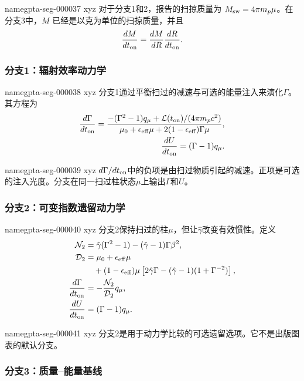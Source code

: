 \documentclass[twocolumn]{aastex702}
\makeatletter
\providecommand{\gptareaderanchor}[1]{\pdfdest name{#1} xyz}%
\providecommand{\gptareaderanchor}[1]{\special{pdf:dest (#1) [ @thispage /XYZ @xpos @ypos null ]}}%
\makeatother
\begin{document}
\gptareaderanchor{gpta-seg-000037}%
对于分支1和2，报告的扫掠质量为 \(M_{\rm sw}=4\pi m_p\mu\)。在分支3中，\(M\) 已经是以克为单位的扫掠质量，并且
\[
\frac{dM}{dt_{\rm on}}=\frac{dM}{dR}\frac{dR}{dt_{\rm on}}.
\]

\subsubsection{分支1：辐射效率动力学}


\gptareaderanchor{gpta-seg-000038}%
分支1通过平衡扫过的减速与可选的能量注入来演化\(\Gamma\)。其方程为
\begin{equation}
\begin{aligned}
\frac{d\Gamma}{dt_{\rm on}}=
\frac{-(\Gamma^2-1)q_\mu
+\mathcal{L}(t_{\rm on})/(4\pi m_pc^2)}
{\mu_0+\epsilon_{\rm eff}\mu
+2(1-\epsilon_{\rm eff})\Gamma\mu},
\\
\frac{dU}{dt_{\rm on}}=(\Gamma-1)q_\mu .
\end{aligned}
\end{equation}

\gptareaderanchor{gpta-seg-000039}%
\(d\Gamma/dt_{\rm on}\)中的负项是由扫过物质引起的减速。正项是可选的注入光度。分支在同一扫过柱状态\(\mu\)上输出\(\Gamma\)和\(U\)。

\subsubsection{分支2：可变指数遗留动力学}


\gptareaderanchor{gpta-seg-000040}%
分支2保持扫过的柱\(\mu\)，但让\(\hat{\gamma}\)改变有效惯性。定义
\begin{equation}
\begin{aligned}
\mathcal{N}_2&=
\hat{\gamma}(\Gamma^2-1)-(\hat{\gamma}-1)\Gamma\beta^2,
\\
\mathcal{D}_2&=\mu_0+\epsilon_{\rm eff}\mu\\
&\quad
+(1-\epsilon_{\rm eff})\mu
\left[
2\hat{\gamma}\Gamma-(\hat{\gamma}-1)(1+\Gamma^{-2})
\right],
\\
\frac{d\Gamma}{dt_{\rm on}}&=-
\frac{\mathcal{N}_2}{\mathcal{D}_2}
q_\mu,\\
\frac{dU}{dt_{\rm on}}&=(\Gamma-1)q_\mu .
\end{aligned}
\end{equation}

\gptareaderanchor{gpta-seg-000041}%
分支2是用于动力学比较的可选遗留选项。它不是出版图表的默认分支。

\subsubsection{分支3：质量--能量基线}
\end{document}
